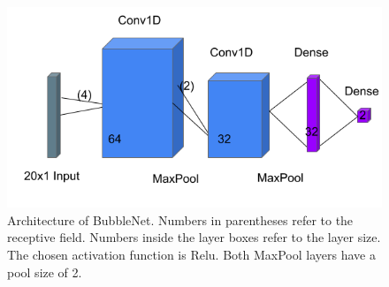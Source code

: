 		\begin{figure}
			\centering
			\includegraphics[scale=0.5]{images/cnn_architecture.png}
			\caption{Architecture of BubbleNet. Numbers in parentheses refer to the receptive field. Numbers inside the layer boxes refer to the layer size. The chosen activation function is Relu. Both MaxPool layers have a pool size of 2.}
			\label{fig:cnn_arch}
			
%
%		
%		
%
%
		\end{figure}
		
